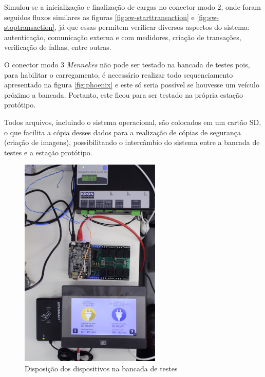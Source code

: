     Simulou-se a inicialização e finalização de cargas no conector modo 2, onde foram seguidos fluxos similares as figuras \ref{fig:sw-starttransaction} e \ref{fig:sw-stoptransaction}, já que essas permitem verificar diversos aspectos do sistema: autenticação, comunicação externa e com medidores, criação de transações, verificação de falhas, entre outras.

    O conector modo 3 \textit{Mennekes} não pode ser testado na bancada de testes pois, para habilitar o carregamento, é necessário realizar todo sequenciamento apresentado na figura \ref{fig:phoenix} e este só seria possível se houvesse um veículo próximo a bancada. Portanto, este ficou para ser testado na própria estação protótipo.

    Todos arquivos, incluindo o sistema operacional, são colocados em um cartão SD, o que facilita a cópia desses dados para a realização de cópias de segurança (criação de imagens), possibilitando o intercâmbio do sistema entre a bancada de testes e a estação protótipo.

    \begin{figure}[H]
      \begin{center}
        \includegraphics[width=0.6\textwidth,natwidth=2130,natheight=1420,angle=-90]{assets/images/setup-tests.jpg}
        \caption{Disposição dos dispositivos na bancada de testes}
        \label{fig:setup-tests}
      \end{center}
    \end{figure}

